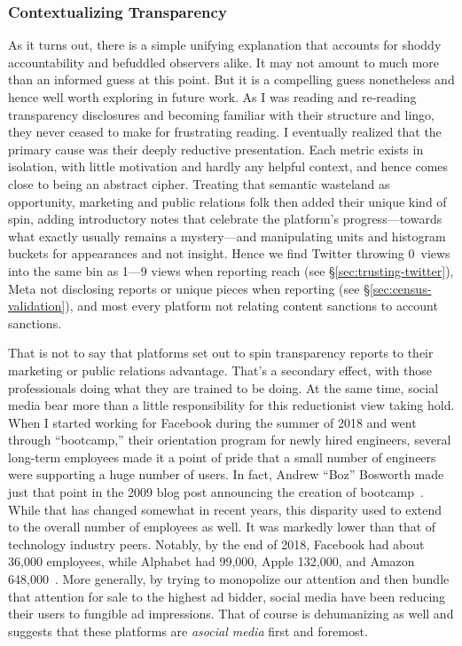 \subsubsection{Contextualizing Transparency}

As it turns out, there is a simple unifying explanation that accounts for shoddy
accountability and befuddled observers alike. It may not amount to much more
than an informed guess at this point. But it is a compelling guess nonetheless
and hence well worth exploring in future work. As I was reading and re-reading
transparency disclosures and becoming familiar with their structure and lingo,
they never ceased to make for frustrating reading. I eventually realized that
the primary cause was their deeply reductive presentation. Each metric exists in
isolation, with little motivation and hardly any helpful context, and hence
comes close to being an abstract cipher. Treating that semantic wasteland as
opportunity, marketing and public relations folk then added their unique kind of
spin, adding introductory notes that celebrate the platform's progress---towards
what exactly usually remains a mystery---and manipulating units and histogram
buckets for appearances and not insight. Hence we find Twitter throwing 0~views
into the same bin as 1—9 views when reporting reach (see
\S\ref{sec:trusting-twitter}), Meta not disclosing  reports or unique
pieces when reporting  (see \S\ref{sec:census-validation}), and most every
platform not relating content sanctions to account sanctions.

That is not to say that platforms set out to spin transparency reports to their
marketing or public relations advantage. That's a secondary effect, with those
professionals doing what they are trained to be doing. At the same time, social
media bear more than a little responsibility for this reductionist view taking
hold. When I started working for Facebook during the summer of 2018 and went
through ``bootcamp,'' their orientation program for newly hired engineers,
several long-term employees made it a point of pride that a small number of
engineers were supporting a huge number of users. In fact, Andrew ``Boz''
Bosworth made just that point in the 2009 blog post announcing the creation of
bootcamp~\cite{Bosworth2009}. While that has changed somewhat in recent years,
this disparity used to extend to the overall number of employees as well. It was
markedly lower than that of technology industry peers. Notably, by the end of
2018, Facebook had about 36,000 employees, while Alphabet had 99,000, Apple
132,000, and Amazon
648,000~\cite{MacrotrendsAlphabet,MacrotrendsAmazon,MacrotrendsApple,MacrotrendsMeta}.
More generally, by trying to monopolize our attention and then bundle that
attention for sale to the highest ad bidder, social media have been reducing
their users to fungible ad impressions. That of course is dehumanizing as well
and suggests that these platforms are \emph{asocial media} first and foremost.

